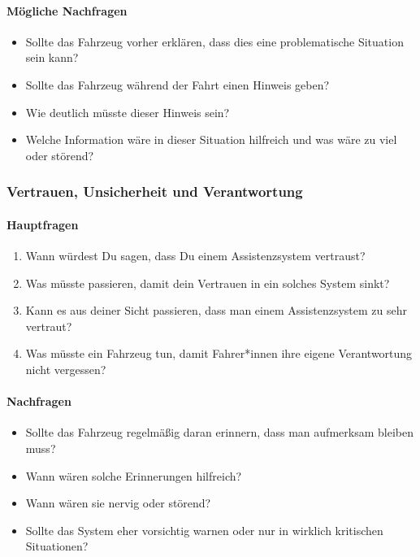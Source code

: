 \paragraph*{Mögliche Nachfragen}

\begin{itemize}
    \item Sollte das Fahrzeug vorher erklären, dass dies eine
          problematische Situation sein kann?
    \item Sollte das Fahrzeug während der Fahrt einen Hinweis geben?
    \item Wie deutlich müsste dieser Hinweis sein?
    \item Welche Information wäre in dieser Situation hilfreich und
          was wäre zu viel oder störend?
\end{itemize}


\subsubsection{Vertrauen, Unsicherheit und Verantwortung}

\paragraph*{Hauptfragen}

\begin{enumerate}
    \item Wann würdest Du sagen, dass Du einem Assistenzsystem vertraust?

    \item Was müsste passieren, damit dein Vertrauen in ein solches
          System sinkt?

    \item Kann es aus deiner Sicht passieren, dass man einem
          Assistenzsystem zu sehr vertraut?

    \item Was müsste ein Fahrzeug tun, damit Fahrer*innen ihre eigene
          Verantwortung nicht vergessen?
\end{enumerate}

\paragraph*{Nachfragen}

\begin{itemize}
    \item Sollte das Fahrzeug regelmäßig daran erinnern, dass man
          aufmerksam bleiben muss?
    \item Wann wären solche Erinnerungen hilfreich?
    \item Wann wären sie nervig oder störend?
    \item Sollte das System eher vorsichtig warnen oder nur in wirklich
          kritischen Situationen?
\end{itemize}


